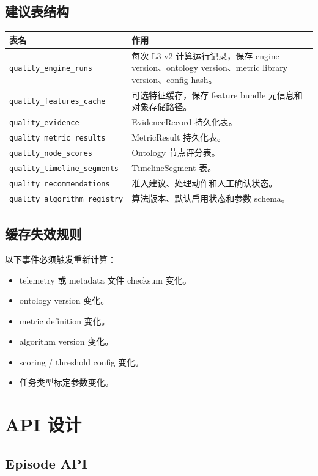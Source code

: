 \documentclass[UTF8,zihao=-4]{ctexart}
\newcommand{\Code}[1]{\texttt{#1}}
\begin{document}
\subsection{建议表结构}

\begin{longtable}{L{4cm} L{9.5cm}}
\toprule
表名 & 作用 \\
\midrule
\Code{quality\_engine\_runs} & 每次 L3 v2 计算运行记录，保存 engine version、ontology version、metric library version、config hash。 \\
\Code{quality\_features\_cache} & 可选特征缓存，保存 feature bundle 元信息和对象存储路径。 \\
\Code{quality\_evidence} & EvidenceRecord 持久化表。 \\
\Code{quality\_metric\_results} & MetricResult 持久化表。 \\
\Code{quality\_node\_scores} & Ontology 节点评分表。 \\
\Code{quality\_timeline\_segments} & TimelineSegment 表。 \\
\Code{quality\_recommendations} & 准入建议、处理动作和人工确认状态。 \\
\Code{quality\_algorithm\_registry} & 算法版本、默认启用状态和参数 schema。 \\
\bottomrule
\end{longtable}

\subsection{缓存失效规则}

以下事件必须触发重新计算：

\begin{itemize}
\item telemetry 或 metadata 文件 checksum 变化。
\item ontology version 变化。
\item metric definition 变化。
\item algorithm version 变化。
\item scoring / threshold config 变化。
\item 任务类型标定参数变化。
\end{itemize}

\section{API 设计}

\subsection{Episode API}
\end{document}
